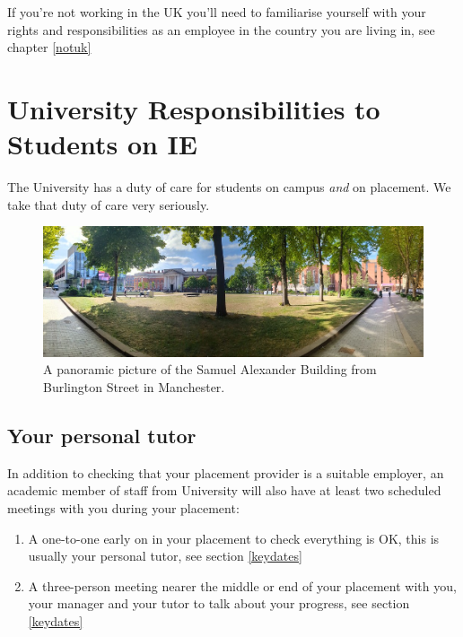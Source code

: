 \documentclass[
]{book}
\providecommand{\tightlist}{%
  \setlength{\itemsep}{0pt}\setlength{\parskip}{0pt}}
\begin{document}
If you're not working in the UK you'll need to familiarise yourself with your rights and responsibilities as an employee in the country you are living in, see chapter \ref{notuk}

\chapter{University Responsibilities to Students on IE}\label{university}

The University has a duty of care for students on campus \emph{and} on placement. We take that duty of care very seriously.

\begin{figure}

{\centering \includegraphics[width=1\linewidth]{images/burlington} 

}

\caption{A panoramic picture of the Samuel Alexander Building from Burlington Street in Manchester.}\label{fig:burlington-fig}
\end{figure}



\section{Your personal tutor}\label{tutor}

In addition to checking that your placement provider is a suitable employer, an academic member of staff from University will also have at least two scheduled meetings with you during your placement:

\begin{enumerate}
\def\labelenumi{\arabic{enumi}.}
\tightlist
\item
  A one-to-one early on in your placement to check everything is OK, this is usually your personal tutor, see section \ref{keydates}
\item
  A three-person meeting nearer the middle or end of your placement with you, your manager and your tutor to talk about your progress, see section \ref{keydates}
\end{enumerate}
\end{document}
